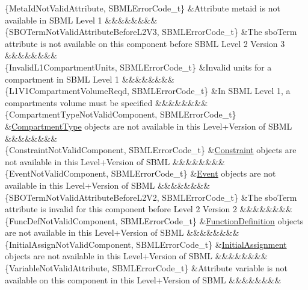 \begin{DoxyParagraph}{}
\begin{longtabu}
\{Meta\+Id\+Not\+Valid\+Attribute, S\+B\+M\+L\+Error\+Code\+\_\+t\} &Attribute \textquotesingle{}metaid\textquotesingle{} is not available in S\+B\+ML Level 1 &&&&&&&&\\
\{S\+B\+O\+Term\+Not\+Valid\+Attribute\+Before\+L2\+V3, S\+B\+M\+L\+Error\+Code\+\_\+t\} &The \textquotesingle{}sbo\+Term\textquotesingle{} attribute is not available on this component before S\+B\+ML Level 2 Version 3 &&&&&&&&\\
\{Invalid\+L1\+Compartment\+Units, S\+B\+M\+L\+Error\+Code\+\_\+t\} &Invalid units for a compartment in S\+B\+ML Level 1 &&&&&&&&\\
\{L1\+V1\+Compartment\+Volume\+Reqd, S\+B\+M\+L\+Error\+Code\+\_\+t\} &In S\+B\+ML Level 1, a compartment\textquotesingle{}s volume must be specified &&&&&&&&\\
\{Compartment\+Type\+Not\+Valid\+Component, S\+B\+M\+L\+Error\+Code\+\_\+t\} &\hyperlink{class_compartment_type}{Compartment\+Type} objects are not available in this Level+\+Version of S\+B\+ML &&&&&&&&\\
\{Constraint\+Not\+Valid\+Component, S\+B\+M\+L\+Error\+Code\+\_\+t\} &\hyperlink{class_constraint}{Constraint} objects are not available in this Level+\+Version of S\+B\+ML &&&&&&&&\\
\{Event\+Not\+Valid\+Component, S\+B\+M\+L\+Error\+Code\+\_\+t\} &\hyperlink{class_event}{Event} objects are not available in this Level+\+Version of S\+B\+ML &&&&&&&&\\
\{S\+B\+O\+Term\+Not\+Valid\+Attribute\+Before\+L2\+V2, S\+B\+M\+L\+Error\+Code\+\_\+t\} &The \textquotesingle{}sbo\+Term\textquotesingle{} attribute is invalid for this component before Level 2 Version 2 &&&&&&&&\\
\{Func\+Def\+Not\+Valid\+Component, S\+B\+M\+L\+Error\+Code\+\_\+t\} &\hyperlink{class_function_definition}{Function\+Definition} objects are not available in this Level+\+Version of S\+B\+ML &&&&&&&&\\
\{Initial\+Assign\+Not\+Valid\+Component, S\+B\+M\+L\+Error\+Code\+\_\+t\} &\hyperlink{class_initial_assignment}{Initial\+Assignment} objects are not available in this Level+\+Version of S\+B\+ML &&&&&&&&\\
\{Variable\+Not\+Valid\+Attribute, S\+B\+M\+L\+Error\+Code\+\_\+t\} &Attribute \textquotesingle{}variable\textquotesingle{} is not available on this component in this Level+\+Version of S\+B\+ML &&&&&&&&\\

\end{longtabu}
\end{DoxyParagraph}
